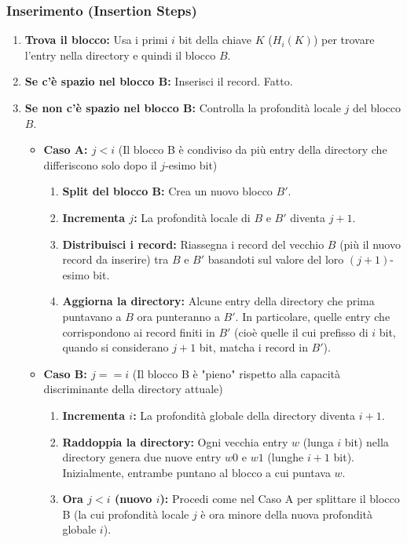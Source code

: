 \subsubsection{Inserimento (Insertion Steps)}
\begin{enumerate}
    \item \textbf{Trova il blocco:} Usa i primi $i$ bit della chiave $K$ ($H_i(K)$) per trovare l'entry nella directory e quindi il blocco $B$.
    \item \textbf{Se c'è spazio nel blocco B:} Inserisci il record. Fatto.
    \item \textbf{Se non c'è spazio nel blocco B:} Controlla la profondità locale $j$ del blocco $B$.
    \begin{itemize}
        \item \textbf{Caso A: $j < i$} (Il blocco B è condiviso da più entry della directory che differiscono solo dopo il $j$-esimo bit)
        \begin{enumerate}
            \item \textbf{Split del blocco B:} Crea un nuovo blocco $B'$.
            \item \textbf{Incrementa $j$:} La profondità locale di $B$ e $B'$ diventa $j+1$.
            \item \textbf{Distribuisci i record:} Riassegna i record del vecchio $B$ (più il nuovo record da inserire) tra $B$ e $B'$ basandoti sul valore del loro $(j+1)$-esimo bit.
            \item \textbf{Aggiorna la directory:} Alcune entry della directory che prima puntavano a $B$ ora punteranno a $B'$. In particolare, quelle entry che corrispondono ai record finiti in $B'$ (cioè quelle il cui prefisso di $i$ bit, quando si considerano $j+1$ bit, matcha i record in $B'$).
        \end{enumerate}
        \item \textbf{Caso B: $j == i$} (Il blocco B è "pieno" rispetto alla capacità discriminante della directory attuale)
        \begin{enumerate}
            \item \textbf{Incrementa $i$:} La profondità globale della directory diventa $i+1$.
            \item \textbf{Raddoppia la directory:} Ogni vecchia entry $w$ (lunga $i$ bit) nella directory genera due nuove entry $w0$ e $w1$ (lunghe $i+1$ bit). Inizialmente, entrambe puntano al blocco a cui puntava $w$.
            \item \textbf{Ora $j < i$ (nuovo $i$):} Procedi come nel Caso A per splittare il blocco B (la cui profondità locale $j$ è ora minore della nuova profondità globale $i$).

\end{enumerate}
\end{itemize}
\end{enumerate}
